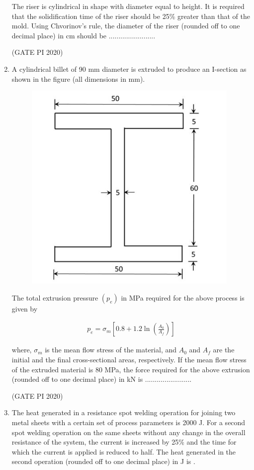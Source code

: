 \documentclass[journal,12pt,onecolumn]{IEEEtran}
\theoremstyle{remark}
\begin{document}
\begin{enumerate}
The riser is cylindrical in shape with diameter equal to height. It is required that the solidification time of the riser should be 25\% greater than that of the mold. Using Chvorinov's rule, the diameter of the riser (rounded off to one decimal place) in cm should be ........................

\hfill (GATE PI 2020)

\item A cylindrical billet of 90 mm diameter is extruded to produce an I-section as shown in the figure (all dimensions in mm).
\begin{figure}[h]
    \centering
    \includegraphics[width=0.5\columnwidth]{figs/fig17.png}
    \caption{}
    \label{fig:placeholder}
\end{figure}

The total extrusion pressure $(p_e)$ in MPa required for the above process is given by

\begin{align*}
p_e = \sigma_m \left[ 0.8 + 1.2 \ln \left( \frac{A_0}{A_f} \right) \right]
\end{align*}

where, $\sigma_m$ is the mean flow stress of the material, and $A_0$ and $A_f$ are the initial and the final cross-sectional areas, respectively. If the mean flow stress of the extruded material is 80 MPa, the force required for the above extrusion (rounded off to one decimal place) in kN is ........................

\hfill (GATE PI 2020)

\item The heat generated in a resistance spot welding operation for joining two metal sheets with a certain set of process parameters is 2000 J. For a second spot welding operation on the same sheets without any change in the overall resistance of the system, the current is increased by 25\% and the time for which the current is applied is reduced to half. The heat generated in the second operation (rounded off to one decimal place) in J is .


\end{enumerate}
\end{document}
